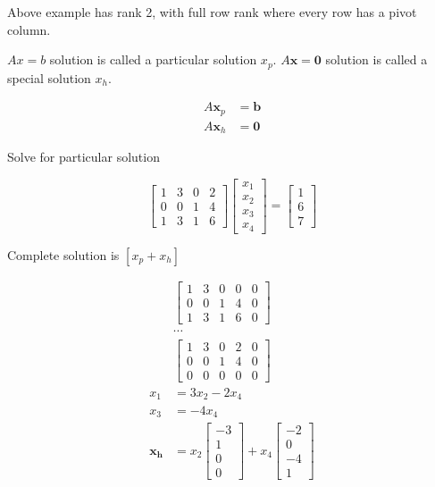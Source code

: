 \documentclass[main.tex]{subfiles}
\begin{document}
Above example has rank 2, with full row rank where every row has a pivot column.

$A x=b$ solution is called a particular solution $x_p$. $A \bm{x}=\bm{0}$ solution is called a special solution $x_h$.

$$
\begin{aligned}
A \bm{x}_p &=\bm{b} \\
A \bm{x}_h &=\bm{0}
\end{aligned}
$$

Solve for particular solution

$$
\left[\begin{array}{llll}
1 & 3 & 0 & 2 \\
0 & 0 & 1 & 4 \\
1 & 3 & 1 & 6
\end{array}\right]\left[\begin{array}{l}
x_{1} \\
x_{2} \\
x_{3} \\
x_{4}
\end{array}\right]=\left[\begin{array}{l}
1 \\
6 \\
7
\end{array}\right]
$$

Complete solution is $\left[x_{p}+x_{h}\right]$

$$
\begin{aligned}
&{\left[\begin{array}{llll|l}
1 & 3 & 0 & 0 & 0 \\
0 & 0 & 1 & 4 & 0 \\
1 & 3 & 1 & 6 & 0
\end{array}\right]} \\
&\cdots\\
&{\left[\begin{array}{llll|l}
1 & 3 & 0 & 2 & 0 \\
0 & 0 & 1 & 4 & 0 \\
0 & 0 & 0 & 0 & 0
\end{array}\right]}\\
x_{1} &= 3x_{2} - 2x_{4} \\
x_{3} &= -4x_{4} \\
\bm{x_h} & = x_{2}\left[\begin{array}{c}
-3 \\
1 \\
0 \\
0
\end{array}\right] + x_{4}\left[\begin{array}{c}
-2 \\
0 \\
-4 \\
1
\end{array}\right]
\end{aligned}
$$
\end{document}
